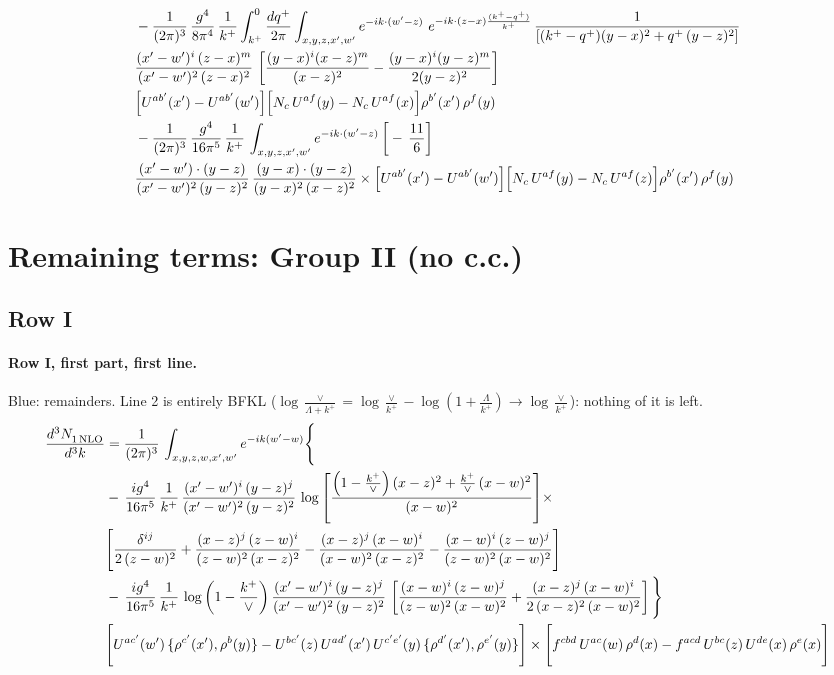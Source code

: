 \documentclass[10pt]{article}
\numberwithin{equation}{section}
\newcommand{\new}[1]{{\color{blue}#1}}
\begin{document}
\begin{align}
& - \frac{1}{(2\pi)^{3}}\,\frac{g^{4}}{8\pi^{4}}\,\frac{1}{k^{+}}\int_{k^{+}}^{0}\frac{dq^{+}}{2\pi}\int_{x,y,z,x',w'}e^{-ik\cdot(w'-z)}\ e^{-ik\cdot(z-x)\frac{(k^{+}-q^{+})}{k^{+}}}\,\frac{1}{\left[(k^{+}-q^{+})(y-x)^{2}+q^{+}\,(y-z)^{2}\right]}\notag \\ & \frac{(x'-w')^{i}\,(z-x)^{m}}{(x'-w')^{2}\,(z-x)^{2}}\,\left[\frac{(y-x)^{i}(x-z)^{m}}{(x-z)^{2}}-\frac{(y-x)^{i}(y-z)^{m}}{2(y-z)^{2}}\right]\notag \\ & \Big[U^{ab'}(x')-U^{ab'}(w')\Big]\Big[N_{c}\,U^{af}(y)-N_{c}\,U^{af}(x)\Big]\rho^{b'}(x')\,\rho^{f}(y) \notag \\
& - \frac{1}{(2\pi)^{3}}\,\frac{g^{4}}{16\pi^{5}}\,\frac{1}{k^{+}}\,\int_{x,y,z,x',w'}e^{-ik\cdot(w'-z)}\,\bigg[-\,\frac{11}{6}\bigg]\notag \\ & \frac{(x'-w')\cdot(y-z)}{(x'-w')^{2}\,(y-z)^{2}}\,\frac{(y-x)\cdot(y-z)}{(y-x)^{2}\,(x-z)^{2}}\times\Big[U^{ab'}(x')-U^{ab'}(w')\Big]\Big[N_{c}\,U^{af}(y)-N_{c}\,U^{af}(z)\Big]\rho^{b'}(x')\,\rho^{f}(y) \label{eq:F:G1V2bfin}
\end{align}

\section{Remaining terms: Group II (no c.c.)}\label{sec:FgII}
\subsection{Row I}
\paragraph{Row I, first part, first line.}
\new{Blue}: remainders. Line 2 is entirely BFKL ($\log\frac{\vee}{\Lambda+k^+}=\log\frac{\vee}{k^+}-\log(1+\frac{\Lambda}{k^+})\to\log\frac{\vee}{k^+}$): nothing of it is left.
\begin{align}
 \frac{d^{3}N_{1\,\rm NLO}^{\rm}}{d^{3}k}  & =     \frac{1}{(2\pi)^{3}}\,\int_{x,y,z,w,x',w^{\prime}} e^{-ik(w^{\prime}-w)}\Bigg\{\notag \\
& -\, \frac{ig^{4}}{16\pi^{5}}\,\frac{1}{k^{+}}\, \frac{(x'-w')^{i}\,(y-z)^{j}}{(x'-w')^{2}\,(y-z)^{2}}\,\log{\left[\frac{\left(1-\frac{k^{+}}{\vee}\right)(x-z)^{2}+\frac{k^{+}}{\vee}\,(x-w)^{2}}{(x-w)^{2}}\right]}\times\notag \\ &  \Bigg[\frac{\delta^{ij}}{2\,(z-w)^{2}}+\frac{(x-z)^{j}\,(z-w)^{i}}{(z-w)^{2}\,(x-z)^{2}}-\frac{(x-z)^{j}\,(x-w)^{i}}{(x-w)^{2}\,(x-z)^{2}}-\frac{(x-w)^{i}\,(z-w)^{j}}{(z-w)^{2}\,(x-w)^{2}}\Bigg] \notag \\
& -\, \frac{ig^{4}}{16\pi^{5}}\,\frac{1}{k^{+}}\,\log{\left(1-\frac{k^{+}}{\vee}\right)}\,\frac{(x'-w')^{i}\,(y-z)^{j}}{(x'-w')^{2}\,(y-z)^{2}}\,\left[\frac{(x-w)^{i}\,(z-w)^{j}}{(z-w)^{2}\,(x-w)^{2}}+\frac{(x-z)^{j}\,(x-w)^{i}}{2\,(x-z)^{2}\, (x-w)^{2}}\right]\Bigg\} \notag \\ & \Bigg[U^{ac'}(w')\,\{\rho^{c'}(x'),\rho^{b}(y)\}-U^{bc'}(z)\,U^{ad'}(x')\,U^{c'e'}(y)\, \{\rho^{d'}(x'),\rho^{e'}(y)\}\Bigg]\times \Bigg[f^{cbd}\,U^{ac}(w)\,\rho^{d}(x)-f^{acd}\, U^{bc}(z)\,U^{de}(x)\,\rho^{e}(x)\Bigg]\notag \\ \label{eq:F:G2I1A}
\end{align}
\end{document}
